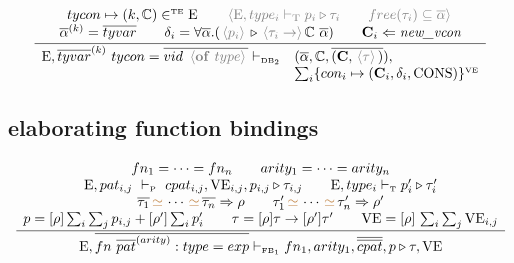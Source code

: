 \documentclass[11pt,a4paper]{article}
\newcommand{\key}[1]{\textrm{\textbf{#1}}}
\newcommand{\qualtype}[2]{#1 \triangleright #2}
\newcommand{\unifylist}[3]{#1\,{\color{brown}{\simeq}}\,\cdots\,{\color{brown}{\simeq}}\,#2 \Rightarrow #3}
\newcommand{\subst}[2]{[#1]\,#2}
\newcommand{\braced}[1]{\{#1\}}
\newcommand{\angled}[1]{\,{\color{gray}\langle#1\rangle}\,}
\newcommand{\Type} {\textrm{T}}
\newcommand{\Env}  {\textrm{E}}
\newcommand{\VE}   {\textrm{VE}}
\newcommand{\sType} {\textrm{\tiny T}}
\newcommand{\sVE}   {\textrm{\tiny VE}}
\newcommand{\sTE}   {\textrm{\tiny TE}}
\newcommand{\sDB}   {\textrm{\tiny DB}}
\newcommand{\sFB}   {\textrm{\tiny FB}}
\newcommand{\VKC}  {\textrm{CONS}}
\newcommand{\tycon}{\mathbb{C}}
\newcommand{\vcon} {\mathbf{C}}
\newcommand{\vdashP}  {\ \vdash_{\textrm{\tiny P}}\  }
\newcommand{\corenew}[1]{\textit{new\_#1}}
\newcommand{\vect}[1]{\overline{#1}}
\begin{document}
\[
\cfrac
 {\begin{array}{c}
  tycon \mapsto (k,\tycon) \in^\sTE \Env 	                \qquad 
  \angled{\Env,type_i \vdash_\Type \qualtype{p_i}{\tau_i} 	\qquad
  free(\tau_i) \subseteq \vect{\alpha}}                 \\
  \vect\alpha^{(k)} = \vect{tyvar}						\qquad
  \delta_i = \forall{\vect\alpha}.
    (\qualtype{\angled{p_i}}{\angled{\tau_i \to }\tycon\ \vect\alpha}) \qquad
  \vcon_i\Leftarrow\corenew{vcon}			                \\
  \end{array} }
 {\begin{array}{ll}
  \Env,\vect{tyvar}^{(k)}\ tycon = \vect{vid\ \angled{\key{of}\ type}} \vdash_{\sDB_2} 
  & (\vect\alpha, \tycon, \vect{(\vcon,\angled{\tau})}), \\
  & \sum_i\braced{con_i \mapsto (\vcon_i,\delta_i,\VKC)}^\sVE \\
  \end{array}}
\]

\subsection{elaborating function bindings}
\[
\cfrac
 {\begin{array}{c}
  fn_1=\cdots=fn_n \qquad arity_1=\cdots=arity_n                                \\
  \Env,pat_{i,j}  \vdashP  cpat_{i,j},\VE_{i,j},\qualtype{p_{i,j}}{\tau_{i,j}}  \qquad
  \Env,type_i \vdash_\sType \qualtype{p_i'}{\tau_i'}                            \\
  \unifylist{\vect{\tau_1}}{\vect{\tau_n}}{\rho}                                \qquad
  \unifylist{\tau_1'}{\tau_n'}{\rho'}                                           \\
  p = [\rho]\sum_i\sum_j p_{i,j} + [\rho']\sum_i p_i' \qquad
  \tau = [\rho]\tau\to[\rho']\tau'          \qquad
  \VE = \subst{\rho}{\sum_i \sum_j \VE_{i,j}}
  \end{array}}
 {\Env, \vect{fn\ \vect{pat}^{(arity)}:type = exp} \vdash_{\sFB_1} 
  fn_1, arity_1, \vect{\vect{cpat}},\qualtype{p}{\tau},\VE}
\]
\end{document}
